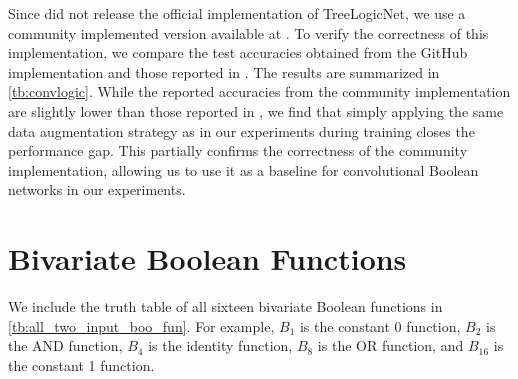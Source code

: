 Since \citet{petersen2024convolutional} did not release the official implementation of TreeLogicNet, we use a community implemented version available at \citet{korinek_convlogic}. To verify the correctness of this implementation, we compare the test accuracies obtained from the GitHub implementation and those reported in \citet{petersen2024convolutional}. The results are summarized in \cref{tb:convlogic}. While the reported accuracies from the community implementation are slightly lower than those reported in \citet{petersen2024convolutional}, we find that simply applying the same data augmentation strategy as in our experiments during training closes the performance gap. This partially confirms the correctness of the community implementation, allowing us to use it as a baseline for convolutional Boolean networks in our experiments.

\begin{table}
\centering
\caption{A comparison between the reported accuracy from \citet{petersen2024convolutional} and the community implemented TreeLogicNet (named ConvLogic).}
\label{tb:convlogic}
\end{table}


\section{Bivariate Boolean Functions}\label{app:bool_fun}

We include the truth table of all sixteen bivariate Boolean functions in \cref{tb:all_two_input_boo_fun}. For example, $B_1$ is the constant 0 function, $B_2$ is the AND function, $B_4$ is the identity function, $B_{8}$ is the OR function, and $B_{16}$ is the constant 1 function.

